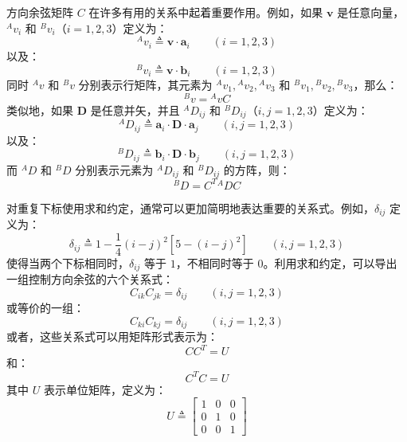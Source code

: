 方向余弦矩阵 \(C\) 在许多有用的关系中起着重要作用。例如，如果 \(\mathbf{v}\) 是任意向量，\( {}^A v_i\) 和 \( {}^B v_i\)（\(i = 1, 2, 3\)）定义为：
\begin{equation}
{}^A v_i \triangleq \mathbf{v} \cdot \mathbf{a}_i \qquad (i = 1, 2, 3) \tag{7}
\end{equation}
以及：
\begin{equation}
{}^B v_i \triangleq \mathbf{v} \cdot \mathbf{b}_i \qquad (i = 1, 2, 3) \tag{8}
\end{equation}
同时 \({}^A v\) 和 \({}^B v\) 分别表示行矩阵，其元素为 \({}^A v_1, {}^A v_2, {}^A v_3\) 和 \({}^B v_1, {}^B v_2, {}^B v_3\)，那么：
\begin{equation}
{}^B v = {}^A v C \tag{9}
\end{equation}
类似地，如果 \(\mathbf{D}\) 是任意并矢，并且 \({}^A D_{ij}\) 和 \({}^B D_{ij}\)（\(i, j = 1, 2, 3\)）定义为：
\begin{equation}
{}^A D_{ij} \triangleq \mathbf{a}_i \cdot \mathbf{D} \cdot \mathbf{a}_j \qquad (i, j = 1, 2, 3) \tag{10}
\end{equation}
以及：
\begin{equation}
{}^B D_{ij} \triangleq \mathbf{b}_i \cdot \mathbf{D} \cdot \mathbf{b}_j \qquad (i, j = 1, 2, 3) \tag{11}
\end{equation}
而 \({}^A D\) 和 \({}^B D\) 分别表示元素为 \({}^A D_{ij}\) 和 \({}^B D_{ij}\) 的方阵，则：
\begin{equation}
{}^B D = C^T {}^A D C \tag{12}
\end{equation}

对重复下标使用求和约定，通常可以更加简明地表达重要的关系式。例如，\(\delta_{ij}\) 定义为：
\begin{equation}
\delta_{ij} \triangleq 1 - \frac{1}{4}(i-j)^2\left[5-(i-j)^2\right] \qquad (i, j = 1, 2, 3) \tag{13}
\end{equation}
使得当两个下标相同时，\(\delta_{ij}\) 等于 \(1\)，不相同时等于 \(0\)。利用求和约定，可以导出一组控制方向余弦的六个关系式：
\begin{equation}
C_{ik} C_{jk} = \delta_{ij} \qquad (i, j = 1, 2, 3) \tag{14}
\end{equation}
或等价的一组：
\begin{equation}
C_{ki} C_{kj} = \delta_{ij} \qquad (i, j = 1, 2, 3) \tag{15}
\end{equation}
或者，这些关系式可以用矩阵形式表示为：
\begin{equation}
C C^T = U \tag{16}
\end{equation}
和：
\begin{equation}
C^T C = U \tag{17}
\end{equation}
其中 \(U\) 表示单位矩阵，定义为：
\begin{equation}
U \triangleq \begin{bmatrix} 1 & 0 & 0 \\ 0 & 1 & 0 \\ 0 & 0 & 1 \end{bmatrix} \tag{18}
\end{equation}

